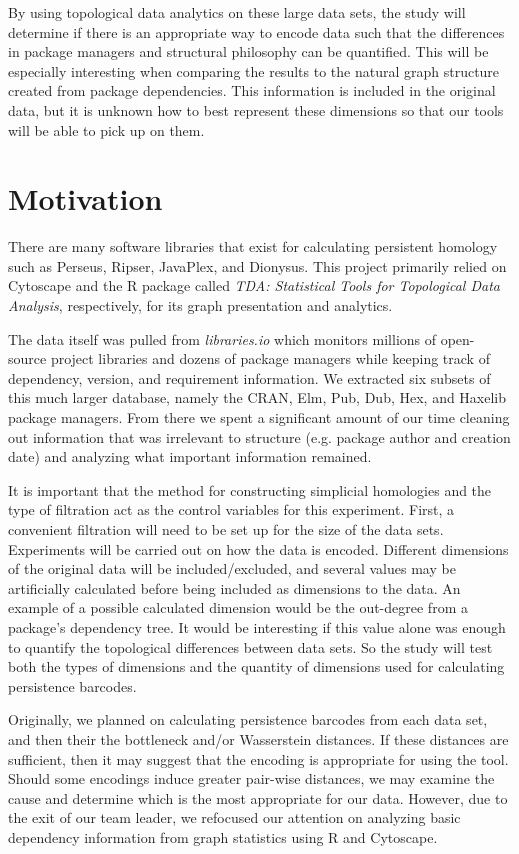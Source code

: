 \documentclass[letterpaper, 10 pt, conference]{ieeeconf}  %
\begin{document}
By using topological data analytics on these large data sets, the study will determine if there is an appropriate way to encode data such that the differences in package managers and structural philosophy can be quantified. This will be especially interesting when comparing the results to the natural graph structure created from package dependencies. This information is included in the original data, but it is unknown how to best represent these dimensions so that our tools will be able to pick up on them.

\section{Motivation}
\label{sec.methods}

There are many software libraries that exist for calculating persistent homology such as Perseus, Ripser, JavaPlex, and Dionysus. This project primarily relied on Cytoscape and the R package called {\it TDA: Statistical Tools for Topological Data Analysis}, respectively, for its graph presentation and analytics.

The data itself was pulled from \emph{libraries.io} which monitors millions of open-source project libraries and dozens of package managers while keeping track of dependency, version, and requirement information. We extracted six subsets of this much larger database, namely the CRAN, Elm, Pub, Dub, Hex, and Haxelib package managers. From there we spent a significant amount of our time cleaning out information that was irrelevant to structure (e.g. package author and creation date) and analyzing what important information remained.

It is important that the method for constructing simplicial homologies and the type of filtration act as the control variables for this experiment. First, a convenient filtration will need to be set up for the size of the data sets. Experiments will be carried out on how the data is encoded. Different dimensions of the original data will be included/excluded, and several values may be artificially calculated before being included as dimensions to the data. An example of a possible calculated dimension would be the out-degree from a package's dependency tree. It would be interesting if this value alone was enough to quantify the topological differences between data sets. So the study will test both the types of dimensions and the quantity of dimensions used for calculating persistence barcodes.

Originally, we planned on calculating persistence barcodes from each data set, and then their the bottleneck and/or Wasserstein distances. 
If these distances are sufficient, then it may suggest that the encoding is appropriate for using the tool. 
Should some encodings induce greater pair-wise distances, we may examine the cause and determine which is the most appropriate for our data.
However, due to the exit of our team leader, we refocused our attention on analyzing basic dependency information from graph statistics using R and Cytoscape.
\end{document}
